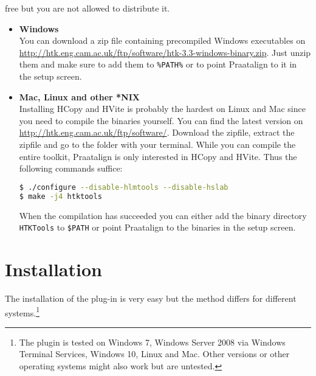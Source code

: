 \begin{itemize}
		free but you are not allowed to distribute it.
		\begin{itemize}
			\item \textbf{Windows}\\
				You can download a zip file containing precompiled Windows executables
				on \url{http://htk.eng.cam.ac.uk/ftp/software/htk-3.3-windows-binary.zip}.
				Just unzip them and make sure to add them to \texttt{\%PATH\%} or to
				point Praatalign to it in the setup screen.
			\item \textbf{Mac, Linux and other *NIX}\\
				Installing HCopy and HVite is probably the hardest on Linux and Mac
				since you need to compile the binaries yourself. You can find the
				latest version on \url{http://htk.eng.cam.ac.uk/ftp/software/}.
				Download the zipfile, extract the zipfile and go to the folder with
				your terminal. While you can compile the entire toolkit, Praatalign is
				only interested in HCopy and HVite. Thus the following commands
				suffice:
				\begin{lstlisting}[language=bash]
$ ./configure --disable-hlmtools --disable-hslab
$ make -j4 htktools
				\end{lstlisting}
				When the compilation has succeeded you can either add the binary
				directory \texttt{HTKTools} to \texttt{\$PATH} or point Praatalign to
				the binaries in the setup screen.
		\end{itemize}
\end{itemize}

\section{Installation}
\label{sec:installation}
The installation of the plug-in is very easy but the method differs for
different systems.\footnote{The plugin is tested on Windows 7, Windows Server
2008 via Windows Terminal Services, Windows 10, Linux and Mac. Other versions
or other operating systems might also work but are untested.}


